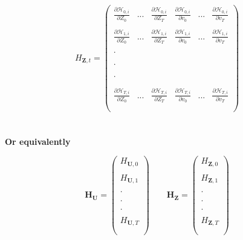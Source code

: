 \documentclass[titlepage]{\econtex}\providecommand{\texname}{BufferStockTheory}
\begin{document}
  $$ H_{\mathbf{Z}, t}= \begin{pmatrix} 
\frac{ \partial \mathcal{H}_{0,i}}{\partial Z_{0}}  & ... & \frac{ \partial \mathcal{H}_{0,i}}{\partial Z_{T}} & \frac{ \partial \mathcal{H}_{0,i}}{\partial v_{0}} & ... & \frac{ \partial \mathcal{H}_{0,i}}{\partial v_{T}} \\ \\ 
\frac{ \partial \mathcal{H}_{1,i}}{\partial Z_{0}}  & ... & \frac{ \partial \mathcal{H}_{1,i}}{\partial Z_{T}} & \frac{ \partial \mathcal{H}_{1,i}}{\partial v_{0}} & ... & \frac{ \partial \mathcal{H}_{1,i}}{\partial v_{T}} \\ \\
. \\ \\ \\ 
. \\ \\ \\
. \\ \\ \\
\frac{ \partial \mathcal{H}_{T,i}}{\partial Z_{0}}  & ... & \frac{ \partial \mathcal{H}_{T,i}}{\partial Z_{T}} & \frac{ \partial \mathcal{H}_{T,i}}{\partial v_{0}} & ... & \frac{ \partial \mathcal{H}_{T,i}}{\partial v_{T}}  \\ \\
 \end{pmatrix} $$ \\ \\
 
 
\textbf{ Or equivalently}

 $$  \mathbf{H}_{\mathbf{U}}= \begin{pmatrix} 
H_{\mathbf{U}, 0} \\ \\ 
H_{\mathbf{U}, 1}  \\ \\
. \\ \\
. \\ \\
. \\ \\ 
H_{\mathbf{U}, T} \\ \\
 \end{pmatrix} \quad \quad \mathbf{H}_{\mathbf{Z}}= \begin{pmatrix} 
H_{\mathbf{Z}, 0} \\ \\ 
H_{\mathbf{Z}, 1}  \\ \\
. \\ \\
. \\ \\
. \\ \\ 
H_{\mathbf{Z}, T} \\ \\
 \end{pmatrix}$$ \\ \\
 
\end{document}
